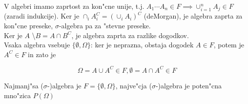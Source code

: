 \documentclass[a4paper,12pt]{article}
\theoremstyle{definition}
\theoremstyle{remark}
\begin{document}
V algebri imamo zaprtost za kon"cne unije, t.j. $A_1 \cdots A_n \in F \implies \cup_{i=1}^n A_j \in F$ (zaradi
indukcije). Ker je $\cap_i A_i^C = (\cup_i A_i)^C$ (deMorgan), je algebra zaprta za kon"cne preseke, $\sigma$-algebra
pa za "stevne preseke. \\
Ker je $A$ \textbackslash $B = A \cap B^C$, je algebra zaprta za razlike dogodkov. \\
Vsaka algebra vsebuje $\{\emptyset, \Omega\}$: ker je neprazna, obstaja dogodek $A \in F$, potem je $A^C \in F$ in
zato je 

\begin{equation*}
    \Omega = A \cup A^C \in F, \emptyset = A \cap A^C \in F
\end{equation*}

Najmanj"sa ($\sigma$-)algebra je $F = \{\emptyset, \Omega\}$, najve"cja ($\sigma$-)algebra je poten"cna mno"zica
$P(\Omega)$
\end{document}
